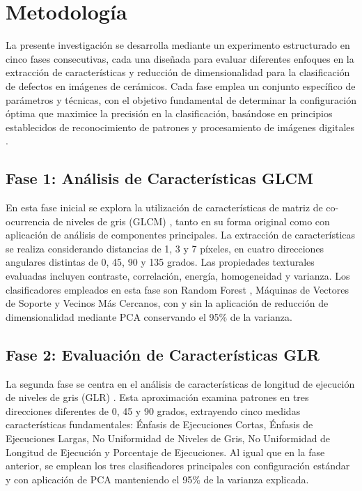 \documentclass[9pt, journal]{IEEEtran}
\begin{document}
  \section{Metodología}

   La presente investigación se desarrolla mediante un experimento
   estructurado en cinco fases consecutivas, cada una diseñada para
   evaluar diferentes enfoques en la extracción de características
   y reducción de dimensionalidad para la clasificación de defectos en
   imágenes de cerámicos. Cada fase emplea un conjunto específico de parámetros
   y técnicas, con el objetivo fundamental de determinar la configuración
   óptima que maximice la precisión en la clasificación, basándose en
   principios establecidos de reconocimiento de patrones \cite{Bishop2006}
   y procesamiento de imágenes digitales \cite{Jain1988-ab}.

  \subsection{Fase 1: Análisis de Características GLCM}

   En esta fase inicial se explora la utilización de características de
   matriz de co-ocurrencia de niveles de gris (GLCM) \cite{Jain1988-ab},
   tanto en su forma original como con aplicación de análisis de componentes
   principales. La extracción de características se realiza considerando
   distancias de 1, 3 y 7 píxeles, en cuatro direcciones angulares distintas
   de 0, 45, 90 y 135 grados. Las propiedades texturales evaluadas incluyen
   contraste, correlación, energía, homogeneidad y varianza. Los
   clasificadores empleados en esta fase son Random Forest
   \cite{Breiman2001}, Máquinas de Vectores de Soporte y Vecinos Más
   Cercanos, con y sin la aplicación de reducción de dimensionalidad
   mediante PCA conservando el 95\% de la varianza.

  \subsection{Fase 2: Evaluación de Características GLR}

   La segunda fase se centra en el análisis de características de longitud
   de ejecución de niveles de gris (GLR) \cite{Jain1988-ab}. Esta
   aproximación examina patrones en tres direcciones diferentes de 0, 45
   y 90 grados, extrayendo cinco medidas características fundamentales:
   Énfasis de Ejecuciones Cortas, Énfasis de Ejecuciones Largas, No
   Uniformidad de Niveles de Gris, No Uniformidad de Longitud de Ejecución
   y Porcentaje de Ejecuciones. Al igual que en la fase anterior, se emplean
   los tres clasificadores principales con configuración estándar y con
   aplicación de PCA manteniendo el 95\% de la varianza explicada.
\end{document}
